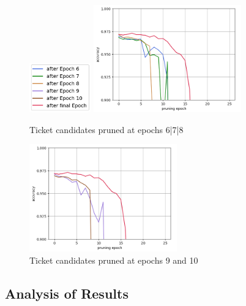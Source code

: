 \begin{figure}
	\begin{minipage}{\textwidth}
		\centering
		\includegraphics[width=100px]{gfx/7-Evaluation/LTH_6_legend.png}
	\end{minipage}
	\begin{minipage}{0.5\textwidth}
		\centering
		\includegraphics[height=175px]{gfx/Experiments/EarlyTicket-MNIST-FCN/678.png}
		\caption*{Ticket candidates pruned at epochs 6|7|8}
		\label{?}
	\end{minipage}\hfill
	\begin{minipage}{0.5\textwidth}
		\centering
		\includegraphics[height=175px]{gfx/Experiments/EarlyTicket-MNIST-FCN/910.png}
		\caption*{Ticket candidates pruned at epochs 9 and 10}
		\label{?}
	\end{minipage}
\end{figure}
\subsection*{Analysis of Results}
